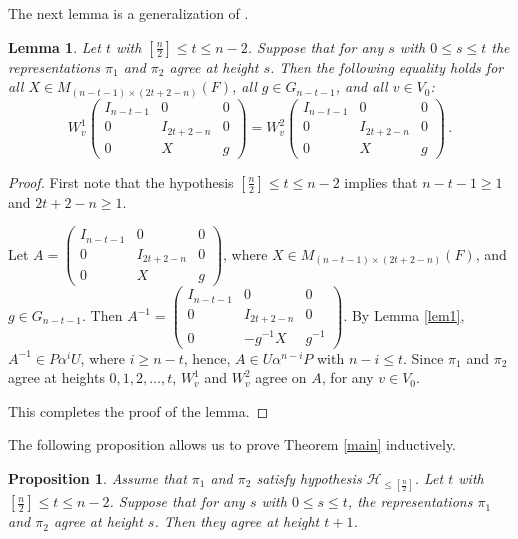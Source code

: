 \documentclass[12pt]{amsart}
\newtheorem{lem}[thm]{Lemma}
\newtheorem{prop}[thm]{Proposition}
\begin{document}
The next lemma is a generalization of \cite[Lemma 3.2]{Ch06}. 

\begin{lem}\label{lem2}
Let $t$ with $[\frac{n}{2}] \leq t \leq n-2$. Suppose that for any $s$ with $0 \leq s \leq t$ the representations $\pi_1$ and $\pi_2$ agree at height $s$. Then the following equality holds
for all $X \in M_{(n-t-1) \times (2t+2-n)}(F)$, all $g \in G_{n-t-1}$, and all $v \in V_0$:
\begin{equation*}
W_v^1 \begin{pmatrix}
I_{n-t-1} & 0 & 0\\
0 & I_{2t+2-n} & 0\\
0 & X & g
\end{pmatrix}=W_v^2 \begin{pmatrix}
I_{n-t-1} & 0 & 0\\
0 & I_{2t+2-n} & 0\\
0 & X & g
\end{pmatrix}\,.
\end{equation*}
\end{lem}

\begin{proof}
First note that the hypothesis $[\frac{n}{2}] \leq t \leq n-2$ implies that $n-t-1 \geq 1$ and $2t+2-n \geq 1$. 

Let $A = \begin{pmatrix}
I_{n-t-1} & 0 & 0\\
0 & I_{2t+2-n} & 0\\
0 & X & g
\end{pmatrix}$, where $X \in M_{(n-t-1) \times (2t+2-n)}(F)$, and $g \in G_{n-t-1}$. Then $A^{-1} = \begin{pmatrix}
I_{n-t-1} & 0 & 0\\
0 & I_{2t+2-n} & 0\\
0 & -g^{-1}X & g^{-1}
\end{pmatrix}$. By Lemma \ref{lem1}, $A^{-1} \in P \alpha^i U$, where $i \geq n-t$, hence, $A \in U \alpha^{n-i} P$ with $n-i \leq t$. Since $\pi_1$ and $\pi_2$ agree at heights $0, 1, 2, \ldots, t$, $W_v^1$ and $W_v^2$ agree on $A$, for any $v \in V_0$.  

This completes the proof of the lemma.
\end{proof}

The following proposition allows us to prove Theorem \ref{main}    
 inductively. 

\begin{prop}\label{prop3}
Assume that $\pi_1$ and $\pi_2$ satisfy hypothesis ${{\mathcal {H}}}_{\leq [\frac{n}{2}]}$. Let $t$ with $[\frac{n}{2}] \leq t \leq n-2$. Suppose that for any $s$ with $0 \leq s \leq t$, the representations $\pi_1$ and $\pi_2$ agree at height $s$. Then they agree at height $t+1$.  
\end{prop}
\end{document}
